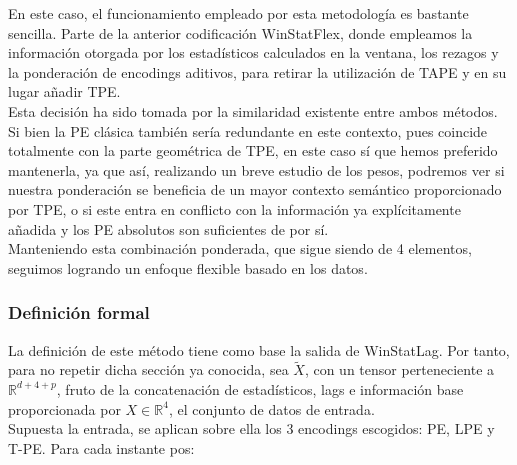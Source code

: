 En este caso, el funcionamiento empleado por esta metodología es bastante sencilla. Parte de la anterior codificación WinStatFlex, donde empleamos la información otorgada por los estadísticos calculados en la ventana, los rezagos y la ponderación de encodings aditivos, para retirar la utilización de TAPE y en su lugar añadir TPE.\\

Esta decisión ha sido tomada por la similaridad existente entre ambos métodos. Si bien la PE clásica también sería redundante en este contexto, pues coincide totalmente con la parte geométrica de TPE, en este caso sí que hemos preferido mantenerla, ya que así, realizando un breve estudio de los pesos, podremos ver si nuestra ponderación se beneficia de un mayor contexto semántico proporcionado por TPE, o si este entra en conflicto con la información ya explícitamente añadida y los PE absolutos son suficientes de por sí.\\

Manteniendo esta combinación ponderada, que sigue siendo de 4 elementos, seguimos logrando un enfoque flexible basado en los datos.


\subsubsection{Definición formal}

La definición de este método tiene como base la salida de WinStatLag. Por tanto, para no repetir dicha sección ya conocida, sea $\tilde{X}$, con un tensor perteneciente a $\mathbb{R}^{d + 4 + p}$, fruto de la concatenación de estadísticos, lags e información base proporcionada por $X  \in \mathbb{R}^4$, el conjunto de datos de entrada.\\

Supuesta la entrada, se aplican sobre ella los 3 encodings escogidos: PE, LPE y T-PE. Para cada instante pos:

